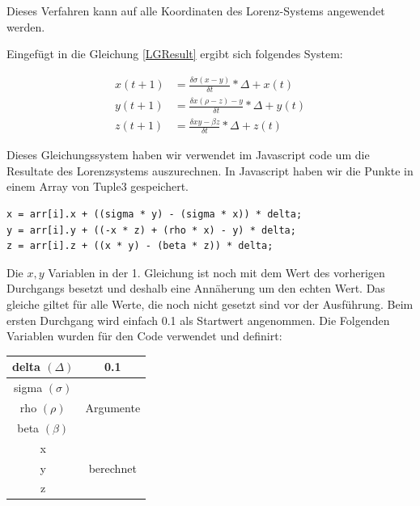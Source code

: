\documentclass[implementation]{subfiles}
\begin{document}
	Dieses Verfahren kann auf alle Koordinaten des Lorenz-Systems angewendet werden.

	Eingefügt in die Gleichung \eqref{LGResult} ergibt sich folgendes System:
	
	\begin{centerFigure}
		\begin{align}
			x(t + 1) &= \frac{\delta \sigma(x - y)}{\delta t} * \Delta + x(t)\\
			y(t + 1) &= \frac{\delta x(\rho - z) - y}{\delta t} * \Delta + y(t)\\
			z(t + 1) &= \frac{\delta xy - \beta z}{\delta t} * \Delta + z(t)
		\end{align}
	\end{centerFigure}
	
	Dieses Gleichungssystem haben wir verwendet im Javascript code um die Resultate des Lorenzsystems auszurechnen. In Javascript haben wir die Punkte in einem Array von Tuple3 gespeichert.
	
	\begin{centerFigure}
		\begin{lstlisting}
x = arr[i].x + ((sigma * y) - (sigma * x)) * delta;
y = arr[i].y + ((-x * z) + (rho * x) - y) * delta;
z = arr[i].z + ((x * y) - (beta * z)) * delta;
		\end{lstlisting}
	\end{centerFigure}
	
	Die $ x, y $ Variablen in der 1. Gleichung ist noch mit dem Wert des vorherigen Durchgangs besetzt und deshalb eine Annäherung um den echten Wert. Das gleiche giltet für alle Werte, die noch nicht gesetzt sind vor der Ausführung. Beim ersten Durchgang wird einfach 0.1 als Startwert angenommen. Die Folgenden Variablen wurden für den Code verwendet und definirt:
	
	\begin{centerFigure}
		\begin{tabular}{| c | c |}
			\hline
			delta $ (\Delta) $ & 0.1 \\\hline
			sigma $ (\sigma) $ & \multirow{3}{*}{Argumente}\\
			rho $(\rho) $ & \\
			beta $ (\beta) $ & \\\hline
			x & \multirow{3}{*}{berechnet}\\
			y & \\
			z & \\\hline
		\end{tabular}
	\end{centerFigure}
\end{document}
